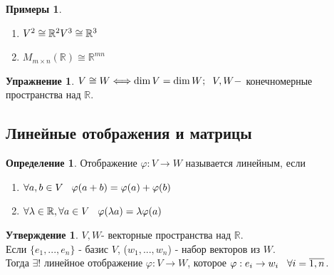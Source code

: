 \documentclass[a4paper, 12pt]{article}
\newcommand{\R}{\mathbb R}
\renewcommand{\phi}{\varphi}
\newcommand\tab[1][.5cm]{\hspace*{#1}}
\theoremstyle{definition}
\newtheorem*{definition}{Определение}
\newtheorem*{subtheorem}{Утверждение}
\newtheorem*{example}{Примеры}
\newtheorem*{Exercise}{Упражнение}
\begin{document}
  \begin{example}\end{example}
  \begin{enumerate}
    \item $V^2 \cong \R^2 \\ V^3 \cong \R^3$ 
    \item $M_{m \times n}(\R) \cong \R^{mn}$
  \end{enumerate}
  \begin{Exercise}
    $V \cong W \Longleftrightarrow \dim V = \dim W; \tab[0.2cm] V,W - $ конечномерные пространства над $\R$.  
  \end{Exercise}
  \subsection{Линейные отображения и матрицы}
  \begin{definition}
    Отображение $\phi: V \to W$ называется линейным, если
    \begin{enumerate}
      \item $\forall a,b \in V \tab[0.3cm] \phi(a+b) = \phi(a) + \phi(b)$
      \item $\forall \lambda \in \R, \forall a \in V \tab[0.3cm] \phi(\lambda a) = \lambda \phi(a)$  
    \end{enumerate}
    
  \end{definition} 
  \begin{subtheorem}
    $V,W$- векторные пространства над $\R$. \\
      Если $\{e_1,...,e_n\}$ - базис $V$, ($w_1,...,w_n$) - набор векторов из $W$. \\Тогда $\exists$! линейное отображение $\phi: V \to W$, которое $\phi: e_i \to w_i \tab[0.3cm]\forall i = \overline{1,n}$.
  \end{subtheorem} 
\end{document}
